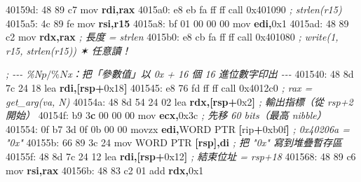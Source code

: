 \documentclass[10pt,a4paper]{article}
\newenvironment{Shaded}{\begin{snugshade}}{\end{snugshade}}
\newcommand{\BaseNTok}[1]{\textcolor[rgb]{0.00,0.00,0.81}{#1}}
\newcommand{\BuiltInTok}[1]{#1}
\newcommand{\CommentTok}[1]{\textcolor[rgb]{0.56,0.35,0.01}{\textit{#1}}}
\newcommand{\DataTypeTok}[1]{\textcolor[rgb]{0.13,0.29,0.53}{#1}}
\newcommand{\DecValTok}[1]{\textcolor[rgb]{0.00,0.00,0.81}{#1}}
\newcommand{\ErrorTok}[1]{\textcolor[rgb]{0.64,0.00,0.00}{\textbf{#1}}}
\newcommand{\FloatTok}[1]{\textcolor[rgb]{0.00,0.00,0.81}{#1}}
\newcommand{\KeywordTok}[1]{\textcolor[rgb]{0.13,0.29,0.53}{\textbf{#1}}}
\newcommand{\NormalTok}[1]{#1}
\newcommand{\OperatorTok}[1]{\textcolor[rgb]{0.81,0.36,0.00}{\textbf{#1}}}
\renewenvironment{Shaded}{%
  \def\FrameCommand{\fboxsep=3.2pt\colorbox{shadecolor}}%
  \MakeFramed{\advance\hsize-\width\FrameRestore\small}%
}{%
  \endMakeFramed
}
\begin{document}
\begin{Shaded}
\begin{Highlighting}[]
\NormalTok{  40159d: 48 89 c7           mov  }\KeywordTok{rdi}\OperatorTok{,}\KeywordTok{rax}
\NormalTok{  4015a0: e8 eb fa ff ff     call }\BaseNTok{0x401090}         \CommentTok{; strlen(r15)}
\NormalTok{  4015a5: 4c 89 fe           mov  }\KeywordTok{rsi}\OperatorTok{,}\KeywordTok{r15}
\NormalTok{  4015a8: bf }\DecValTok{01} \DecValTok{00} \DecValTok{00} \DecValTok{00}\NormalTok{     mov  }\KeywordTok{edi}\OperatorTok{,}\BaseNTok{0x1}
\NormalTok{  4015ad: 48 89 c2           mov  }\KeywordTok{rdx}\OperatorTok{,}\KeywordTok{rax}           \CommentTok{; 長度 = strlen}
\NormalTok{  4015b0: e8 cb fa ff ff     call }\BaseNTok{0x401080}         \CommentTok{; write(1, r15, strlen(r15))  ✶ 任意讀！}
\end{Highlighting}
\end{Shaded}

\begin{Shaded}
\begin{Highlighting}[]
  \CommentTok{; {-}{-}{-} \%N$p / \%N$x：把「參數值」以 0x + 16 個 16 進位數字印出 {-}{-}{-}}
\NormalTok{  401540: 48 8d 7c 24 18     }\BuiltInTok{lea}  \KeywordTok{rdi}\OperatorTok{,[}\KeywordTok{rsp}\OperatorTok{+}\BaseNTok{0x18}\OperatorTok{]}
\NormalTok{  401545: e8 }\DecValTok{76}\NormalTok{ fd ff ff     call }\BaseNTok{0x4012c0}         \CommentTok{; rax = get\_arg(va, N)}
\NormalTok{  40154a: 48 8d 54 24 02     }\BuiltInTok{lea}  \KeywordTok{rdx}\OperatorTok{,[}\KeywordTok{rsp}\OperatorTok{+}\BaseNTok{0x2}\OperatorTok{]}    \CommentTok{; 輸出指標（從 rsp+2 開始）}
\NormalTok{  40154f: b9 }\DecValTok{3}\ErrorTok{c} \DecValTok{00} \DecValTok{00} \DecValTok{00}\NormalTok{     mov  }\KeywordTok{ecx}\OperatorTok{,}\BaseNTok{0x3c}         \CommentTok{; 先移 60 bits（最高 nibble）}
\NormalTok{  401554: 0f b7 }\DecValTok{3}\BaseNTok{d} \FloatTok{0}\BaseNTok{f} \BaseNTok{0b} \DecValTok{00} \DecValTok{00}\NormalTok{  movzx }\KeywordTok{edi}\OperatorTok{,}\DataTypeTok{WORD} \DataTypeTok{PTR} \OperatorTok{[}\NormalTok{rip}\OperatorTok{+}\BaseNTok{0xb0f}\OperatorTok{]}  \CommentTok{; 0x40206a = "0x"}
\NormalTok{  40155b: 66 89 3c 24        }\BuiltInTok{mov}  \DataTypeTok{WORD} \DataTypeTok{PTR} \OperatorTok{[}\KeywordTok{rsp}\OperatorTok{],}\KeywordTok{di}          \CommentTok{; 把 "0x" 寫到堆疊暫存區}
\NormalTok{  40155f: 48 8d 7c 24 12     }\BuiltInTok{lea}  \KeywordTok{rdi}\OperatorTok{,[}\KeywordTok{rsp}\OperatorTok{+}\BaseNTok{0x12}\OperatorTok{]}   \CommentTok{; 結束位址 = rsp+18}
\NormalTok{  401568: 48 89 c6           mov  }\KeywordTok{rsi}\OperatorTok{,}\KeywordTok{rax}
\NormalTok{  40156b: 48 83 c2 }\DecValTok{01}\NormalTok{        add  }\KeywordTok{rdx}\OperatorTok{,}\BaseNTok{0x1}

\end{Highlighting}
\end{Shaded}
\end{document}
